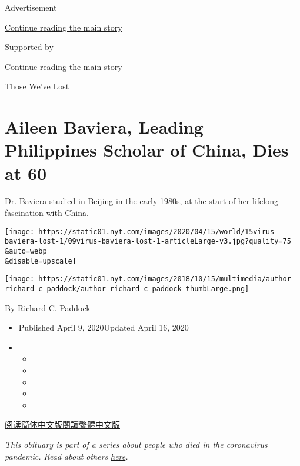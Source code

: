 Advertisement

\protect\hyperlink{after-top}{Continue reading the main story}

Supported by

\protect\hyperlink{after-sponsor}{Continue reading the main story}

Those We've Lost

\hypertarget{aileen-baviera-leading-philippines-scholar-of-china-dies-at-60}{%
\section{Aileen Baviera, Leading Philippines Scholar of China, Dies at
60}\label{aileen-baviera-leading-philippines-scholar-of-china-dies-at-60}}

Dr. Baviera studied in Beijing in the early 1980s, at the start of her
lifelong fascination with China.

\texttt{[image: https://static01.nyt.com/images/2020/04/15/world/15virus-baviera-lost-1/09virus-baviera-lost-1-articleLarge-v3.jpg?quality=75\\\&auto=webp\\\&disable=upscale]}

\href{https://www.nytimes.com/by/richard-c-paddock}{\texttt{[image: https://static01.nyt.com/images/2018/10/15/multimedia/author-richard-c-paddock/author-richard-c-paddock-thumbLarge.png]}}

By \href{https://www.nytimes.com/by/richard-c-paddock}{Richard C.
Paddock}

\begin{itemize}
\item
  Published April 9, 2020Updated April 16, 2020
\item
  \begin{itemize}
  \item
  \item
  \item
  \item
  \item
  \end{itemize}
\end{itemize}

\href{https://cn.nytimes.com/obits/20200410/aileen-baviera-dead-coronavirus/}{阅读简体中文版}\href{https://cn.nytimes.com/obits/20200410/aileen-baviera-dead-coronavirus/zh-hant/}{閱讀繁體中文版}

\emph{This obituary is part of a series about people who died in the
coronavirus pandemic. Read about others}
\href{https://www.nytimes.com/series/people-who-have-died-of-the-coronavirus}{\emph{here}}\emph{.}

